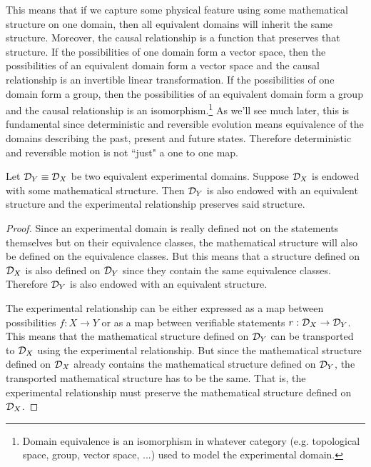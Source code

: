 This means that if we capture some physical feature using some mathematical structure on one domain, then all equivalent domains will inherit the same structure. Moreover, the causal relationship is a function that preserves that structure. If the possibilities of one domain form a vector space, then the possibilities of an equivalent domain form a vector space and the causal relationship is an invertible linear transformation. If the possibilities of one domain form a group, then the possibilities of an equivalent domain form a group and the causal relationship is an isomorphism.\footnote{Domain equivalence is an isomorphism in whatever category (e.g. topological space, group, vector space, ...) used to model the experimental domain.} As we'll see much later, this is fundamental since deterministic and reversible evolution means equivalence of the domains describing the past, present and future states. Therefore deterministic and reversible motion is not ``just" a one to one map.

\begin{mathSection}
	\begin{thrm}\label{pm-cd-domainEquivalenceIsIsomorphism}
		Let $\mathcal{D}_Y \equiv \mathcal{D}_X$ be two equivalent experimental domains. Suppose $\mathcal{D}_X$ is endowed with some mathematical structure. Then $\mathcal{D}_Y$ is also endowed with an equivalent structure and the experimental relationship preserves said structure.
	\end{thrm}
	\begin{proof}
		Since an experimental domain is really defined not on the statements themselves but on their equivalence classes, the mathematical structure will also be defined on the equivalence classes. But this means that a structure defined on $\mathcal{D}_X$ is also defined on $\mathcal{D}_Y$ since they contain the same equivalence classes. Therefore $\mathcal{D}_Y$ is also endowed with an equivalent structure.
		
		The experimental relationship can be either expressed as a map between possibilities $f : X \to Y$ or as a map between verifiable statements $r : \mathcal{D}_X \to \mathcal{D}_Y$. This means that the mathematical structure defined on $\mathcal{D}_Y$ can be transported to $\mathcal{D}_X$ using the experimental relationship. But since the mathematical structure defined on $\mathcal{D}_X$ already contains the mathematical structure defined on $\mathcal{D}_Y$, the transported mathematical structure has to be the same. That is, the experimental relationship must preserve the mathematical structure defined on $\mathcal{D}_X$.
	\end{proof}
\end{mathSection}

